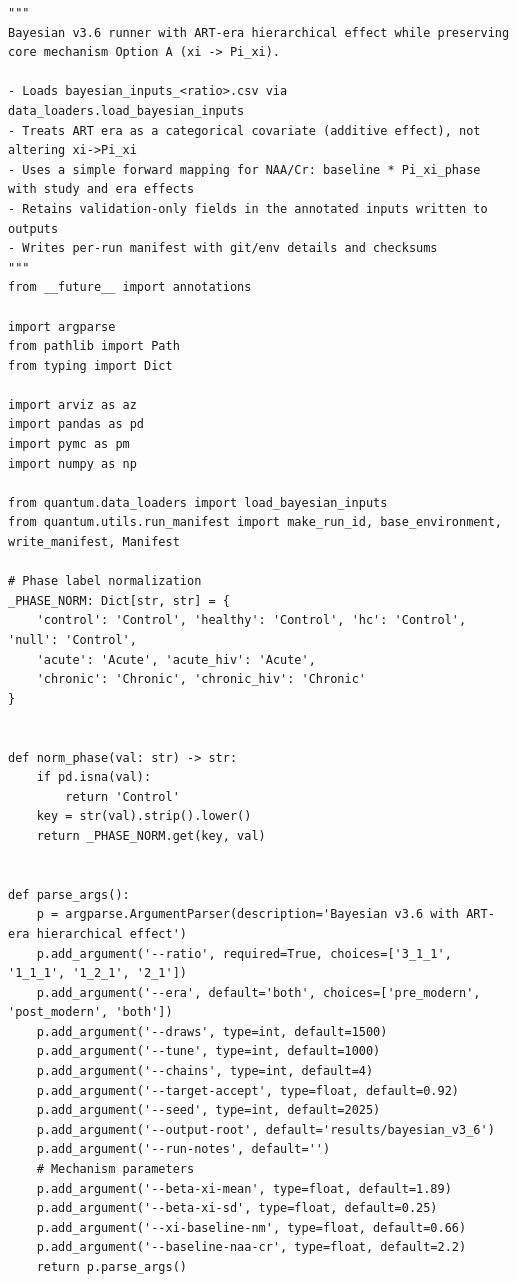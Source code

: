 \documentclass[11pt]{article}
\begin{document}
\begin{lstlisting}[caption={Bayesian v3.6 Runner (Lines 1--100)}]
"""
Bayesian v3.6 runner with ART-era hierarchical effect while preserving
core mechanism Option A (xi -> Pi_xi).

- Loads bayesian_inputs_<ratio>.csv via data_loaders.load_bayesian_inputs
- Treats ART era as a categorical covariate (additive effect), not altering xi->Pi_xi
- Uses a simple forward mapping for NAA/Cr: baseline * Pi_xi_phase with study and era effects
- Retains validation-only fields in the annotated inputs written to outputs
- Writes per-run manifest with git/env details and checksums
"""
from __future__ import annotations

import argparse
from pathlib import Path
from typing import Dict

import arviz as az
import pandas as pd
import pymc as pm
import numpy as np

from quantum.data_loaders import load_bayesian_inputs
from quantum.utils.run_manifest import make_run_id, base_environment, write_manifest, Manifest

# Phase label normalization
_PHASE_NORM: Dict[str, str] = {
    'control': 'Control', 'healthy': 'Control', 'hc': 'Control', 'null': 'Control',
    'acute': 'Acute', 'acute_hiv': 'Acute',
    'chronic': 'Chronic', 'chronic_hiv': 'Chronic'
}


def norm_phase(val: str) -> str:
    if pd.isna(val):
        return 'Control'
    key = str(val).strip().lower()
    return _PHASE_NORM.get(key, val)


def parse_args():
    p = argparse.ArgumentParser(description='Bayesian v3.6 with ART-era hierarchical effect')
    p.add_argument('--ratio', required=True, choices=['3_1_1', '1_1_1', '1_2_1', '2_1'])
    p.add_argument('--era', default='both', choices=['pre_modern', 'post_modern', 'both'])
    p.add_argument('--draws', type=int, default=1500)
    p.add_argument('--tune', type=int, default=1000)
    p.add_argument('--chains', type=int, default=4)
    p.add_argument('--target-accept', type=float, default=0.92)
    p.add_argument('--seed', type=int, default=2025)
    p.add_argument('--output-root', default='results/bayesian_v3_6')
    p.add_argument('--run-notes', default='')
    # Mechanism parameters
    p.add_argument('--beta-xi-mean', type=float, default=1.89)
    p.add_argument('--beta-xi-sd', type=float, default=0.25)
    p.add_argument('--xi-baseline-nm', type=float, default=0.66)
    p.add_argument('--baseline-naa-cr', type=float, default=2.2)
    return p.parse_args()



\end{lstlisting}
\end{document}
